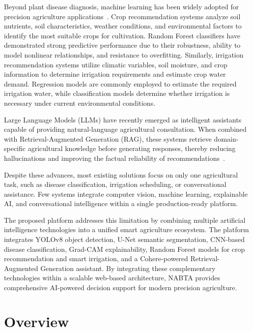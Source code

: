 Beyond plant disease diagnosis, machine learning has been widely adopted for precision agriculture applications~\cite{fao2021}. Crop recommendation systems analyze soil nutrients, soil characteristics, weather conditions, and environmental factors to identify the most suitable crops for cultivation. Random Forest classifiers have demonstrated strong predictive performance due to their robustness, ability to model nonlinear relationships, and resistance to overfitting. Similarly, irrigation recommendation systems utilize climatic variables, soil moisture, and crop information to determine irrigation requirements and estimate crop water demand. Regression models are commonly employed to estimate the required irrigation water, while classification models determine whether irrigation is necessary under current environmental conditions.

Large Language Models (LLMs) have recently emerged as intelligent assistants capable of providing natural-language agricultural consultation. When combined with Retrieval-Augmented Generation (RAG), these systems retrieve domain-specific agricultural knowledge before generating responses, thereby reducing hallucinations and improving the factual reliability of recommendations~\cite{lewis2020rag,cohere2024}.

Despite these advances, most existing solutions focus on only one agricultural task, such as disease classification, irrigation scheduling, or conversational assistance. Few systems integrate computer vision, machine learning, explainable AI, and conversational intelligence within a single production-ready platform.

The proposed \nabta platform addresses this limitation by combining multiple artificial intelligence technologies into a unified smart agriculture ecosystem. The platform integrates YOLOv8 object detection, U-Net semantic segmentation, CNN-based disease classification, Grad-CAM explainability, Random Forest models for crop recommendation and smart irrigation, and a Cohere-powered Retrieval-Augmented Generation assistant. By integrating these complementary technologies within a scalable web-based architecture, NABTA provides comprehensive AI-powered decision support for modern precision agriculture.

\section{Overview}
\label{sec:analysis_overview}


